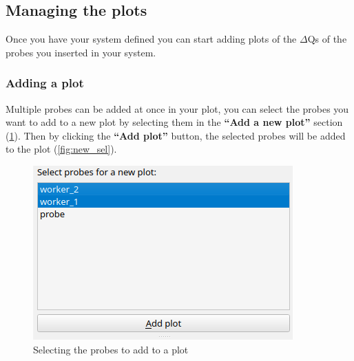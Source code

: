 \subsection{Managing the plots} 
    Once you have your system defined you can start adding plots of the $\Delta$Qs of the probes you inserted in your system.
    
    \subsubsection{Adding a plot}

    Multiple probes can be added at once in your plot, you can select the probes you want to add to a new plot by selecting them in the \textbf{``Add a new plot''} section (\cref{fig:sel_prob}). Then by clicking the \textbf{``Add plot''} button, the selected probes will be added to the plot (\cref{fig:new_sel}). 
 
    \begin{figure}[H]
        \begin{center}
        \includegraphics[width = \textwidth]{img/manual/add_plot2.png}
        \end{center}
        \caption{Selecting the probes to add to a plot}
        \label{fig:sel_prob}
    \end{figure}

